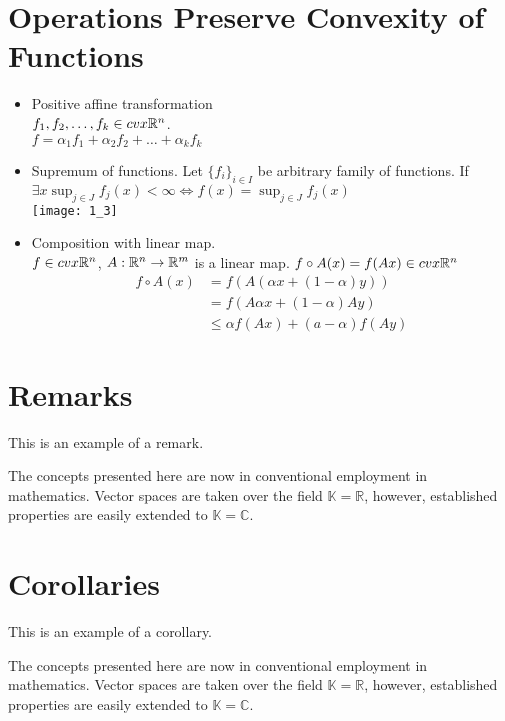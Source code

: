 \section{Operations Preserve Convexity of Functions}
\begin{itemize}
\item Positive affine transformation \\
$f_1,f_2,\ldots,f_k \in \space cvx \mathbb{R}^n$.\\
$f = \alpha_1 f_1 + \alpha_2 f_2 + \ldots + \alpha_k f_k$
\item Supremum of functions. Let $\{ f_i \}_{i \in I}$ be arbitrary family of functions. If $\exists x \sup_{j \in J} f_j(x) < \infty \Leftrightarrow f(x) = \sup_{j \in J} f_j(x) $\\
\texttt{[image: 1\_3]}
\item Composition with linear map.\\
$f \in cvx \mathbb{R}^n$, $A:\mathbb{R}^n \to \mathbb{R}^m$ is a linear map.
$f \circ A (x) = f(Ax) \in cvx \mathbb{R}^n$\\
\begin{align*}
f \circ A (x) & = f(A(\alpha x + (1-\alpha) y)) \\
& = f(A \alpha x + (1-\alpha) A y) \\
& \le \alpha f(Ax) + (a - \alpha) f(Ay)
\end{align*}
\end{itemize}

\section{Remarks}

This is an example of a remark.

\begin{remark}
The concepts presented here are now in conventional employment in mathematics. Vector spaces are taken over the field $\mathbb{K}=\mathbb{R}$, however, established properties are easily extended to $\mathbb{K}=\mathbb{C}$.
\end{remark}


\section{Corollaries}

This is an example of a corollary.

\begin{corollary}
The concepts presented here are now in conventional employment in mathematics. Vector spaces are taken over the field $\mathbb{K}=\mathbb{R}$, however, established properties are easily extended to $\mathbb{K}=\mathbb{C}$.
\end{corollary}

